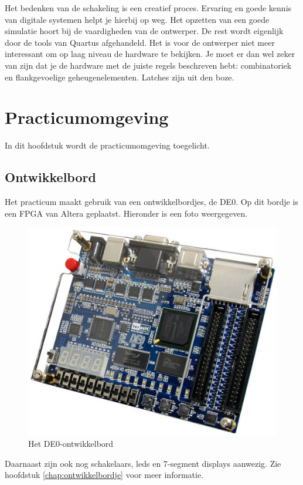 \documentclass[a4paper,12pt,fleqn,twoside]{book}
\begin{document}
Het bedenken van de schakeling is een creatief proces. Ervaring en goede kennis
van digitale systemen helpt je hierbij op weg. Het opzetten van een goede
simulatie hoort bij de vaardigheden van de ontwerper. De rest wordt eigenlijk
door de tools van Quartus afgehandeld. Het is voor de ontwerper niet meer
interessant om op laag niveau de hardware te bekijken. Je moet er dan
wel zeker van zijn dat je de hardware met de juiste regels beschreven hebt:
combinatoriek en flankgevoelige geheugenelementen. Latches zijn uit den boze.


\chapter{Practicumomgeving}
\label{chap:practicumomgeving}
In dit hoofdstuk wordt de practicumomgeving toegelicht.


\section{Ontwikkelbord}
\label{sec:ontwikkelbord}
Het practicum maakt gebruik van een ontwikkelbordjes, de DE0. Op dit bordje
is een FPGA van Altera geplaatst. Hieronder is een foto weergegeven.

\begin{figure}[H]
\centering
\includegraphics[scale=0.63]{image-de0.jpg}
\caption{Het DE0-ontwikkelbord}
\label{fig:image-de0}
\end{figure}
 
Daarnaast zijn ook nog schakelaars, leds en 7-segment displays aanwezig. Zie
hoofdstuk \ref{chap:ontwikkelbordje} voor meer informatie.
\end{document}
